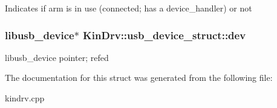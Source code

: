 Indicates if arm is in use (connected; has a device\+\_\+handler) or not \hypertarget{structKinDrv_1_1usb__device__struct_a9b0ea0b72fe367e18da99404e9d57c9d}{
\subsubsection[{dev}]{\setlength{\rightskip}{0pt plus 5cm}libusb\+\_\+device$\ast$ Kin\+Drv\+::usb\+\_\+device\+\_\+struct\+::dev}}\label{structKinDrv_1_1usb__device__struct_a9b0ea0b72fe367e18da99404e9d57c9d}
libusb\+\_\+device pointer; refed 

The documentation for this struct was generated from the following file\+:\begin{DoxyCompactItemize}
\item 
kindrv.\+cpp\end{DoxyCompactItemize}
